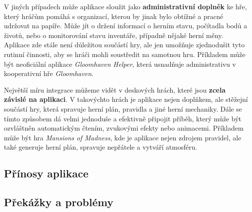 V jiných případech může aplikace sloužit jako \textbf{administrativní doplněk} ke hře, který hráčům pomáhá s organizací, kterou by jinak bylo obtížné a pracné udržovat na papíře. Může jít o držení informací o herním stavu, počítadla bodů a životů, nebo o monitorování stavu inventáře, případně nějaké herní měny. Aplikace zde stále není důležitou součástí hry, ale jen umožňuje zjednodušit tyto rutinní činnosti, aby se hráči mohli soustředit na samotnou hru. Příkladem může být neoficiální aplikace \textit{Gloomhaven Helper}, která usnadňuje administrativu v kooperativní hře \textit{Gloomhaven}.

Největší míru integrace můžeme vidět v deskových hrách, které jsou \textbf{zcela závislé na aplikaci}. V takovýchto hrách je aplikace nejen doplňkem, ale stěžejní součástí hry, která spravuje herní plán, pravidla a jiné herní mechaniky. Dále se tímto způsobem dá velmi jednoduše a efektivně připojit příběh, který může být ozvláštněn automatickým čtením, zvukovými efekty nebo animacemi. Příkladem může být hra \textit{Mansions of Madness}, kde je aplikace nejen zdrojem pravidel, ale také generuje herní plán, spravuje nepřátele a vytváří atmosféru.

\subsection{Přínosy aplikace}
\label{subsec:app_benefits}

\subsection{Překážky a problémy}
\label{subsec:app_problems}
